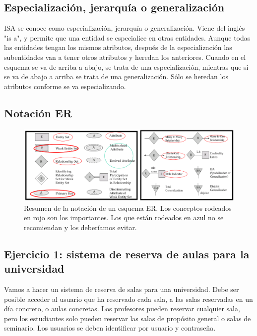 \subsection{Especialización, jerarquía o generalización}
ISA se conoce como especialización, jerarquía o generalización. Viene del inglés "is a", y permite que una entidad se especialice en otras entidades. Aunque todas las entidades tengan los mismos atributos, después de la especialización las subentidades van a tener otros atributos y heredan los anteriores. Cuando en el esquema se va de arriba a abajo, se trata de una especialización, mientras que si se va de abajo a arriba se trata de una generalización. Sólo se heredan los atributos conforme se va especializando.

\subsection{Notación ER}

\begin{figure}[htbp]
\centering
\includegraphics[width=\linewidth]{figs/notacion-er.png}
\caption{Resumen de la notación de un esquema ER. Los conceptos rodeados en rojo son los importantes. Los que están rodeados en azul no se recomiendan y los deberíamos evitar.}
\end{figure}

\subsection{Ejercicio 1: sistema de reserva de aulas para la universidad}
Vamos a hacer un sistema de reserva de salas para una universidad. Debe ser posible acceder al usuario que ha reservado cada sala, a las salas reservadas en un día concreto, o aulas concretas. Los profesores pueden reservar cualquier sala, pero los estudiantes solo pueden reservar las salas de propósito general o salas de seminario. Los usuarios se deben identificar por usuario y contraseña. 

